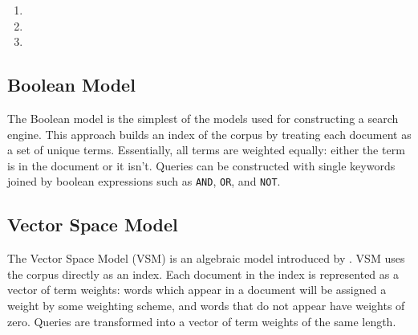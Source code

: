 \documentclass[12pt,draft]{Manuscript}
\begin{document}
\begin{body}
\begin{enumerate}
\def\labelenumi{\arabic{enumi}.}
\item
\item
\item
\end{enumerate}

\subsection{Boolean Model}\label{boolean-model}

The Boolean model is the simplest of the models used for constructing a
search engine. This approach builds an index of the corpus by treating
each document as a set of unique terms. Essentially, all terms are
weighted equally: either the term is in the document or it isn't.
Queries can be constructed with single keywords joined by boolean
expressions such as \lstinline!AND!, \lstinline!OR!, and
\lstinline!NOT!.

\subsection{Vector Space Model}\label{vector-space-model}

The Vector Space Model (VSM) is an algebraic model introduced by
\citet{Salton-etal:1975}. VSM uses the corpus directly as an index. Each
document in the index is represented as a vector of term weights: words
which appear in a document will be assigned a weight by some weighting
scheme, and words that do not appear have weights of zero. Queries are
transformed into a vector of term weights of the same length.


\end{body}
\end{document}
